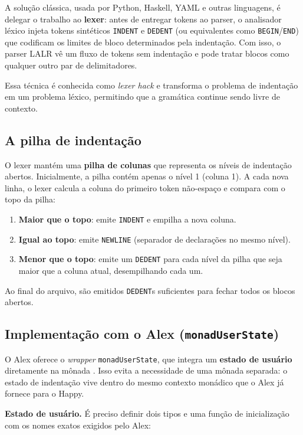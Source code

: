 A solução clássica, usada por Python, Haskell, YAML e outras
linguagens, é delegar o trabalho ao \textbf{lexer}: antes de entregar
tokens ao parser, o analisador léxico injeta tokens sintéticos
\texttt{INDENT} e \texttt{DEDENT} (ou equivalentes como
\texttt{BEGIN}/\texttt{END}) que codificam os limites de bloco
determinados pela indentação. Com isso, o parser LALR vê um fluxo
de tokens sem indentação e pode tratar blocos como qualquer outro
par de delimitadores.

Essa técnica é conhecida como \emph{lexer hack} e transforma o
problema de indentação em um problema léxico, permitindo que a
gramática continue sendo livre de contexto.

\subsection{A pilha de indentação}

O lexer mantém uma \textbf{pilha de colunas} que representa os
níveis de indentação abertos. Inicialmente, a pilha contém apenas
o nível 1 (coluna 1). A cada nova linha, o lexer calcula a coluna
do primeiro token não-espaço e compara com o topo da pilha:

\begin{enumerate}
  \item \textbf{Maior que o topo}: emite \texttt{INDENT} e empilha a nova coluna.
  \item \textbf{Igual ao topo}: emite \texttt{NEWLINE} (separador de declarações
    no mesmo nível).
  \item \textbf{Menor que o topo}: emite um \texttt{DEDENT} para
    cada nível da pilha que seja maior que a coluna atual, desempilhando cada um.
\end{enumerate}

Ao final do arquivo, são emitidos \texttt{DEDENT}s suficientes para
fechar todos os blocos abertos.

\subsection{Implementação com o Alex (\texttt{monadUserState})}

O Alex oferece o \emph{wrapper} \texttt{monadUserState}, que integra
um \textbf{estado de usuário} diretamente na mônada .
Isso evita a necessidade de uma mônada separada: o estado de
indentação vive dentro do mesmo contexto monádico que o Alex já
fornece para o Happy.

\textbf{Estado de usuário.} É preciso definir dois tipos e uma
função de inicialização com os nomes exatos exigidos pelo Alex:

